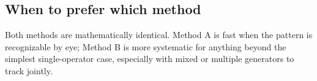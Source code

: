 \documentclass[../main.tex]{subfiles}
\begin{document}





\subsection{When to prefer which method}
Both methods are mathematically identical. Method A is fast when the pattern is
recognizable by eye; Method B is more systematic for anything beyond the simplest
single-operator case, especially with mixed or multiple generators to track jointly.
\end{document}
